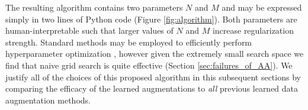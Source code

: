 The resulting algorithm contains two parameters $N$ and $M$ and may be expressed simply in two lines of Python code (Figure \ref{fig:algorithm}).
Both parameters are human-interpretable such that larger values of $N$ and $M$ increase regularization strength.
Standard methods may be employed to efficiently perform hyperparameter optimization \cite{snoek2012practical, golovin2017google}, however given the extremely small search space we find that naive grid search is quite effective (Section \ref{sec:failures_of_AA}). We justify all of the choices of this proposed algorithm in this subsequent sections by comparing the efficacy of the learned augmentations to {\em all} previous learned data augmentation methods.

 